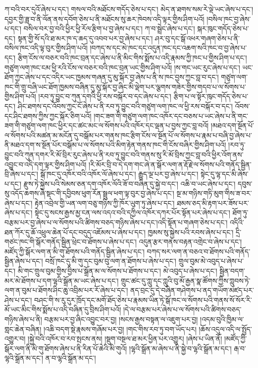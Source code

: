ཀ་བའི་བར་དུའོ་ཞེས་པ་དང་། གསལ་བའི་མཐོངས་གདོད་ཅེས་པ་དང་། མེད་ན་ཐགས་སམ་རེ་ལྡེ་ཡང་ཞེས་པ་དང་། དབྱར་གྱི་ཟླ་བ་ནི་ལོན་ནས་དབོག་ཅེས་པ་ནི་མཐོངས་སུ་ཆར་ཁེབས་འདི་ལྟར་གྱིས་ཤིག་པའོ། །བསིལ་ཁང་བྱ་ཞེས་པ་དང་། བསིལ་བར་བྱ་བའི་ཕྱིར་ཕྱི་རོལ་རྩིག་པ་བྱ་ཞེས་པ་དང་། ཀ་བ་སྦྲེང་ཞེས་པ་དང་། སྐར་ཁུང་གདོད་ཅེས་པ་དང་། སྟན་གྱི་སོ་དའི་ཐ་མར་ཁ་ད་ཆད་དུ་འབབ་པར་བྱ་ཞེས་པ་དང་། ཤར་བུ་དང་སྒོ་འཕར་གཞག་ཅེས་པ་ནི་བསིལ་ཁང་འདི་ལྟ་བུར་གྱིས་ཤིག་པའོ། །བཀད་ས་དང་མེ་ཁང་དང་འདུན་ཁང་དང་འཆག་སའི་ཁང་བ་བྱ་ཞེས་པ་དང་། རྩིག་ངོས་ལ་བཅར་བའི་ཁང་བྲན་དང་ཞེས་པ་ནི་མིང་གིས་སྨོས་པ་འདི་རྣམས་ཀྱི་ཁང་པ་གྱིས་ཤིག་པ་དང་། གཙུག་ལག་ཁང་ངམ་ཕྱི་རའི་ངོས་ལ་བཅར་བའི་ཁང་བྲན་ཡང་གྱིས་ཤིག་པའོ། །ས་གང་ཡང་རུང་ཞེས་པ་དང་། ཡང་ཐོག་ཀྱང་ཞེས་པ་དང་འདིར་ཡང་ཁྱམས་གཞན་དུ་མུ་སྐོར་བྱ་ཞེས་པ་ནི་ས་ཁང་བྱས་ཀྱང་བླ་བ་དང་། གཙུག་ལག་ཁང་གི་གྲུ་བཞི་ཡང་ཐོག་ཁྱམས་བཞིན་དུ་མུ་སྐོར་བྱ་ཞིང་མི་ལྡེག་པར་ལྕགས་གཟེར་གྱིས་གདབ་པ་ལ་སོགས་པ་གྱིས་ཤིག་པའོ། །རབ་ཏུ་བྱུང་བ་ཀུན་དགའི་ཕྱི་རས་བསྐོར་བ་དང་ཞེས་པ་དང་། རྩིག་པ་ལ་སྟོར་ཁུང་གདོད་ཅེས་པ་དང་། ཤིང་ཐགས་དང་འོབས་ཀྱང་ངོ་ཞེས་པ་ནི་རབ་ཏུ་བྱུང་བའི་གཙུག་ལག་ཁང་ལ་ཕྱི་རས་བསྐོར་བ་དང་། འོབས་དང་ཤིང་ཐགས་ཀྱིས་ཀྱང་སྐོར་ཅིག་པའོ། །གང་ཟག་གི་གཙུག་ལག་ཁང་འཁོར་དང་བཅས་པ་ཡང་ཞེས་པ་ནི་གང་ཟག་གི་གཙུག་ལག་ཁང་ཕྱིར་དང་ཚང་མང་ལ་སོགས་པའི་འཁོར་དང་ལྡན་པ་བྱས་ཀྱང་བླ་བའོ། །མཐའ་དག་སྔོན་པོ་ལ་སོགས་པའི་མཚན་མ་མངོན་དུ་བསྒོམ་པར་གནས་ཁང་རྩིག་ངོས་ལ་སྔོན་པོ་ལ་སོགས་པ་རྣམ་པ་བཞི་བྱ་ཞེས་པ་ནི་མཐའ་དག་ས་སྔོན་པོར་བསྒོམ་པ་ལ་སོགས་པའི་མིག་རྟེན་གནས་ཁང་གི་ངོས་བཞིར་གྱིས་ཤིག་པའོ། །རབ་ཏུ་བྱུང་བའི་ཀུན་དགར་རི་མོ་བྲིར་རུང་ཞེས་པ་ནི་རབ་ཏུ་བྱུང་བའི་གནས་སུ་རི་མོ་བྲིས་ཀྱང་བླ་བའི་ཕྱིར་འོག་ནས་འབྱུང་བ་འདི་དག་ལྟར་གྱིས་ཤིག་པའོ། །རི་མོར་བྲི་བ་དེ་དག་གང་ཞེ་ན་སྒོར་ལག་ན་རྡོ་རྗེ་ལ་སོགས་པའི་གནོད་སྦྱིན་བྲི་ཞེས་པ་དང་། སྒོ་ཁང་དུ་འཁོར་བའི་འཁོར་ལོ་ཞེས་པ་དང་། རྒྱུད་ལྔ་པར་བྱ་ཞེས་པ་དང་། སྟེང་དུ་ལྷ་དང་མི་ཞེས་པ་དང་། རྫུས་ཏེ་སྐྱེས་པའི་སེམས་ཅན་དག་འཁོར་ལོའི་ཟོ་བ་བཞིན་དུ་སྐྱེ་བ་དང་། འཆི་བ་ཡང་ཞེས་པ་དང་། དབུས་སུ་འདོད་ཆགས་ཞེ་སྡང་གི་དབྱིབས་ཕུག་རོན་སྦྲུལ་ཕག་ལྟ་བུར་བྱ་ཞེས་པ་དང་། སྔ་མ་གཉིས་གཏི་མུག་གིས་ཟ་བར་ཞེས་པ་དང་། རྟེན་འབྲེལ་གྱི་ཡན་ལག་བཅུ་གཉིས་ཀྱི་ཁོར་ཡུག་ཏུ་ཞེས་པ་དང་། ཐམས་ཅད་མི་རྟག་པར་ཟོས་པར་ཞེས་པ་དང་། སྟེང་དུ་སངས་རྒྱས་མྱ་ངན་ལས་འདའ་བའི་དཀྱིལ་འཁོར་དཀར་པོར་སྟོན་པར་ཞེས་པ་དང་། ཐོག་ཏུ་བརྩམ་པར་བྱ་ཞེས་པ་ལ་སོགས་པའི་ཚིགས་བཅད་གཉིས་ཞེས་པ་དང་།འདི་སྟོན་པ་གཞག་ཅེས་པ་དང་། འདིའི་ཐན་ཀོར་དུ་ཆོ་འཕྲུལ་ཆེན་པོ་དང་བདུད་འཇོམས་པ་ཞེས་པ་དང་། ཁྱམས་སུ་སྐྱེས་པའི་རབས་ཞེས་པ་དང་། དྲི་གཙང་ཁང་གི་སྒོར་གནོད་སྦྱིན་ཕྲེང་བ་ཐོགས་པ་ཞེས་པ་དང་། འདུན་རྩར་གནས་བརྟན་འགྲེང་བ་ཞེས་པ་དང་། མཛོད་ཀྱི་སྒོར་ལག་ན་མི་གུ་ཐོགས་པའི་གནོད་སྦྱིན་ཞེས་པ་དང་། བཀད་སར་ལག་ན་བཅའ་བ་ཐོགས་པའི་གནོད་སྦྱིན་ཞེས་པ་དང་། བསྲོ་ཁང་དུ་མི་གུ་དང་བུམ་བུ་ལག་ན་ཐོགས་པ་ཞེས་པ་དང་། གྲུལ་བུམ་མེ་འབུད་པ་ཞེས་པ་དང་། མི་གང་གྲུལ་བུམ་གྱིས་བྱིས་པ་སྒྲོན་མ་ལ་སོགས་པ་ཐོགས་པ་དང་། མེ་འབུད་པ་ཞེས་པ་དང་། སྦྱིན་བདག་མར་མེ་ཐོགས་པ་དག་ལྷའི་སྒྲོན་མ་ཡང་ཞེས་པ་དང་། གྲུང་ཚང་དུ་ཀླུ་དང་ཀླུའི་བུ་མོ་རྒྱན་སྣ་ཚོགས་ཀྱིས་ཀླུབས་ཏེ་ལག་ན་བུམ་པ་ཐོགས་ཤིང་ཆུ་འབྲིམ་པར་རོ་ཞེས་པ་དང་། ནད་བྲང་དུ་དེ་བཞིན་གཤེགས་པ་ནད་གཡོག་མཛད་པར་ཤེས་པ་དང་། བཤང་གི་ས་རུ་དུར་ཁྲོད་དང་མགོ་ཐོད་ཅེས་པ་རྣམས་ཡིན་ཏེ་སྒོ་ཁང་ལ་སོགས་པའི་གནས་སོ་སོར་རི་མོ་ཡང་མིང་གིས་སྨོས་པ་འདི་བཞིན་དུ་བྲིས་ཤིག་པའོ། །དེ་ལ་བརྩམ་པར་ཞེས་པ་ལ་སོགས་པའི་ཚིགས་བཅད་གཉིས་ཞེས་པ་ནི། བརྩམ་པར་བྱ་ཞིང་འབྱུང་བར་བྱ། །སངས་རྒྱས་བསྟན་ལ་འཇུག་པར་བྱ། །འདམ་བུའི་ཁྱིམ་ལ་གླང་ཆེན་བཞིན། །འཆི་བདག་སྡེ་རྣམས་གཞོམ་པར་བྱ། །གང་གིས་རབ་ཏུ་བག་ཡོད་པར། །ཆོས་འདུལ་འདི་ལ་སྤྱོད་འགྱུར་བ། །སྐྱེ་བའི་འཁོར་བ་རབ་སྤངས་ནས། །སྡུག་བསྔལ་ཐ་མར་ཕྱིན་པར་འགྱུར། །ཞེས་པ་ཡིན་ནོ། །མཛོད་ཀྱི་སྒོར་ལག་ནི་མི་གུ་ཐོགས་ཞེས་པ་ནི་རིན་པོ་ཆེའི་མི་གུའོ། །ལྷའི་སྒྲོན་མ་ཞེས་པ་ནི་སྐྱེ་བ་ལྷའི་སྒྲོན་མ་དང་། རྒ་བ་ལྷའི་སྒྲོན་མ་དང་། ན་བ་ལྷའི་སྒྲོན་མ་དང་། 
